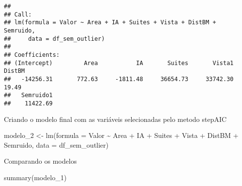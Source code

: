 \documentclass[
]{article}
\newenvironment{Shaded}{\begin{snugshade}}{\end{snugshade}}
\newcommand{\AttributeTok}[1]{\textcolor[rgb]{0.77,0.63,0.00}{#1}}
\newcommand{\FunctionTok}[1]{\textcolor[rgb]{0.00,0.00,0.00}{#1}}
\newcommand{\NormalTok}[1]{#1}
\newcommand{\OtherTok}[1]{\textcolor[rgb]{0.56,0.35,0.01}{#1}}
\newcommand{\SpecialCharTok}[1]{\textcolor[rgb]{0.00,0.00,0.00}{#1}}
\begin{document}
\begin{verbatim}
## 
## Call:
## lm(formula = Valor ~ Area + IA + Suites + Vista + DistBM + Semruido, 
##     data = df_sem_outlier)
## 
## Coefficients:
## (Intercept)         Area           IA       Suites       Vista1       DistBM  
##   -14256.31       772.63     -1811.48     36654.73     33742.30        19.49  
##   Semruido1  
##    11422.69
\end{verbatim}

Criando o modelo final com as variáveis selecionadas pelo metodo stepAIC

\begin{Shaded}
\begin{Highlighting}[]
\NormalTok{modelo\_2  }\OtherTok{\textless{}{-}} \FunctionTok{lm}\NormalTok{(}\AttributeTok{formula =}\NormalTok{ Valor }\SpecialCharTok{\textasciitilde{}}\NormalTok{ Area }\SpecialCharTok{+}\NormalTok{ IA }\SpecialCharTok{+}\NormalTok{ Suites }\SpecialCharTok{+}\NormalTok{ Vista }\SpecialCharTok{+}\NormalTok{ DistBM }\SpecialCharTok{+}\NormalTok{ Semruido, }
                  \AttributeTok{data =}\NormalTok{ df\_sem\_outlier)}
\end{Highlighting}
\end{Shaded}

Comparando os modelos

\begin{Shaded}
\begin{Highlighting}[]
\FunctionTok{summary}\NormalTok{(modelo\_1)}
\end{Highlighting}
\end{Shaded}
\end{document}
